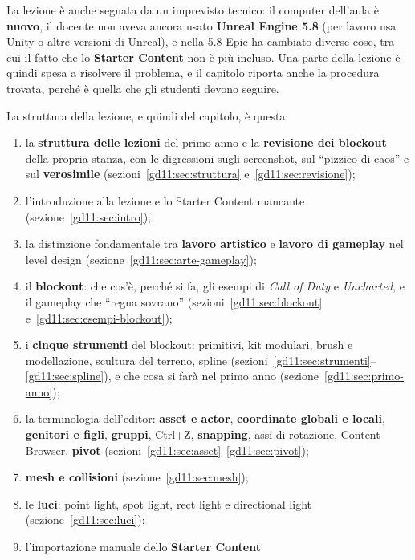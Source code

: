 La lezione è anche segnata da un imprevisto tecnico: il computer dell'aula è
\textbf{nuovo}, il docente non aveva ancora usato \textbf{Unreal Engine 5.8}
(per lavoro usa Unity o altre versioni di Unreal), e nella 5.8 Epic ha cambiato
diverse cose, tra cui il fatto che lo \textbf{Starter Content} non è più
incluso. Una parte della lezione è quindi spesa a risolvere il problema, e il
capitolo riporta anche la procedura trovata, perché è quella che gli studenti
devono seguire.

La struttura della lezione, e quindi del capitolo, è questa:
\begin{enumerate}
  \item la \textbf{struttura delle lezioni} del primo anno e la
        \textbf{revisione dei blockout} della propria stanza, con le
        digressioni sugli screenshot, sul ``pizzico di caos'' e sul
        \textbf{verosimile} (sezioni~\ref{gd11:sec:struttura}
        e~\ref{gd11:sec:revisione});
  \item l'introduzione alla lezione e lo Starter Content mancante
        (sezione~\ref{gd11:sec:intro});
  \item la distinzione fondamentale tra \textbf{lavoro artistico} e
        \textbf{lavoro di gameplay} nel level design
        (sezione~\ref{gd11:sec:arte-gameplay});
  \item il \textbf{blockout}: che cos'è, perché si fa, gli esempi di
        \emph{Call of Duty} e \emph{Uncharted}, e il gameplay che ``regna
        sovrano'' (sezioni~\ref{gd11:sec:blockout}
        e~\ref{gd11:sec:esempi-blockout});
  \item i \textbf{cinque strumenti} del blockout: primitivi, kit modulari,
        brush e modellazione, scultura del terreno, spline
        (sezioni~\ref{gd11:sec:strumenti}--\ref{gd11:sec:spline}), e che
        cosa si farà nel primo anno (sezione~\ref{gd11:sec:primo-anno});
  \item la terminologia dell'editor: \textbf{asset e actor},
        \textbf{coordinate globali e locali}, \textbf{genitori e figli},
        \textbf{gruppi}, Ctrl+Z, \textbf{snapping}, assi di rotazione,
        Content Browser, \textbf{pivot}
        (sezioni~\ref{gd11:sec:asset}--\ref{gd11:sec:pivot});
  \item \textbf{mesh e collisioni} (sezione~\ref{gd11:sec:mesh});
  \item le \textbf{luci}: point light, spot light, rect light e
        directional light (sezione~\ref{gd11:sec:luci});
  \item l'importazione manuale dello \textbf{Starter Content}

\end{enumerate}
